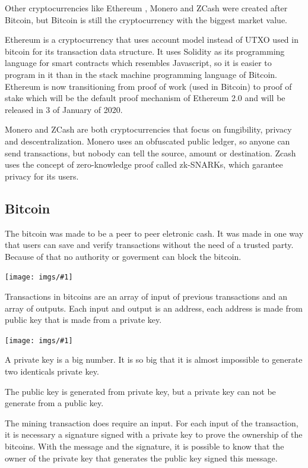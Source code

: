 \documentclass[12pt]{article}
\newcommand{\incimg}[1]{\texttt{[image: imgs/\#1]}}
\begin{document}
Other cryptocurrencies like Ethereum \cite{wood2014ethereum}, Monero \cite{noether2015ring} and
ZCash \cite{hopwood2016zcash} were created after Bitcoin,
but Bitcoin is still the cryptocurrency with the biggest market value.

Ethereum is a cryptocurrency that uses account model instead of UTXO used in bitcoin for its
transaction data structure.
It uses Solidity as its programming language for smart contracts which resembles Javascript,
so it is easier to program in it than in the stack machine programming language of Bitcoin.
Ethereum is now transitioning from proof of work (used in Bitcoin) to proof of stake
which will be the default proof mechanism of Ethereum 2.0 and will be released in
3 of January of 2020.

Monero and ZCash are both cryptocurrencies that focus on fungibility, privacy and descentralization.
Monero uses an obfuscated public ledger, so anyone can send transactions,
but nobody can tell the source, amount or destination.
Zcash uses the concept of zero-knowledge proof called zk-SNARKs, which garantee privacy for its users.

\subsection{Bitcoin}

The bitcoin was made to be a peer to peer eletronic cash.
It was made in one way that users can save and verify transactions without the need of a trusted party.
Because of that no authority or goverment can block the bitcoin.

\incimg{transactions1.png}

Transactions in bitcoins are an array of input of previous transactions and an array of outputs.
Each input and output is an address, each address is made from public key that is made from a private key.

\incimg{privatekey.png}

A private key is a big number.
It is so big that it is almost impossible to generate two identicals private key.

The public key is generated from private key,
but a private key can not be generate from a public key.

The mining transaction does require an input.
For each input of the transaction, it is necessary a signature signed with a private key to prove the
ownership of the bitcoins.
With the message and the signature, it is possible to know that the owner of the private key
that generates the public key signed this message.
\end{document}
